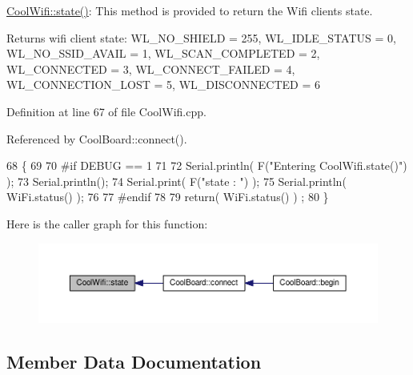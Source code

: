 \hyperlink{classCoolWifi_a1c7b4d82a4098d346e7593dce92039fa}{Cool\+Wifi\+::state()}\+: This method is provided to return the Wifi client\textquotesingle{}s state. \begin{DoxyReturn}{Returns}
wifi client state\+: W\+L\+\_\+\+N\+O\+\_\+\+S\+H\+I\+E\+LD = 255, W\+L\+\_\+\+I\+D\+L\+E\+\_\+\+S\+T\+A\+T\+US = 0, W\+L\+\_\+\+N\+O\+\_\+\+S\+S\+I\+D\+\_\+\+A\+V\+A\+IL = 1, W\+L\+\_\+\+S\+C\+A\+N\+\_\+\+C\+O\+M\+P\+L\+E\+T\+ED = 2, W\+L\+\_\+\+C\+O\+N\+N\+E\+C\+T\+ED = 3, W\+L\+\_\+\+C\+O\+N\+N\+E\+C\+T\+\_\+\+F\+A\+I\+L\+ED = 4, W\+L\+\_\+\+C\+O\+N\+N\+E\+C\+T\+I\+O\+N\+\_\+\+L\+O\+ST = 5, W\+L\+\_\+\+D\+I\+S\+C\+O\+N\+N\+E\+C\+T\+ED = 6 
\end{DoxyReturn}


Definition at line 67 of file Cool\+Wifi.\+cpp.



Referenced by Cool\+Board\+::connect().


\begin{DoxyCode}
68 \{
69 
70 \textcolor{preprocessor}{#if DEBUG == 1 }
71 
72     Serial.println( F(\textcolor{stringliteral}{"Entering CoolWifi.state()"}) );
73     Serial.println();   
74     Serial.print( F(\textcolor{stringliteral}{"state : "}) );
75     Serial.println( WiFi.status() );
76 
77 \textcolor{preprocessor}{#endif}
78     
79     \textcolor{keywordflow}{return}( WiFi.status() ) ;
80 \}
\end{DoxyCode}
Here is the caller graph for this function\+:\nopagebreak
\begin{figure}[H]
\begin{center}
\leavevmode
\includegraphics[width=350pt]{classCoolWifi_a1c7b4d82a4098d346e7593dce92039fa_icgraph}
\end{center}
\end{figure}


\subsection{Member Data Documentation}
\mbox{\label{classCoolWifi_a0c3332a149245aaad060b32593a54c9b}} 
